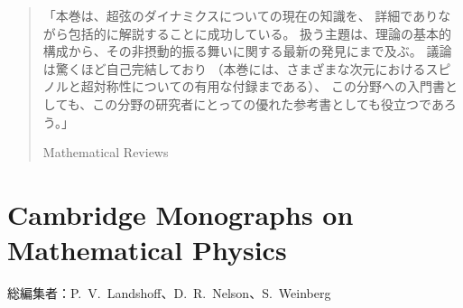 \begin{quote}
「本巻は、超弦のダイナミクスについての現在の知識を、
詳細でありながら包括的に解説することに成功している。
扱う主題は、理論の基本的構成から、その非摂動的振る舞いに関する最新の発見にまで及ぶ。
議論は驚くほど自己完結しており
（本巻には、さまざまな次元におけるスピノルと超対称性についての有用な付録まである）、
この分野への入門書としても、この分野の研究者にとっての優れた参考書としても役立つであろう。」
\begin{flushright}Mathematical Reviews\end{flushright}
\end{quote}

\clearpage
\section*{Cambridge Monographs on Mathematical Physics}
\noindent 総編集者：P.~V.~Landshoff、D.~R.~Nelson、S.~Weinberg
\begingroup
\small
